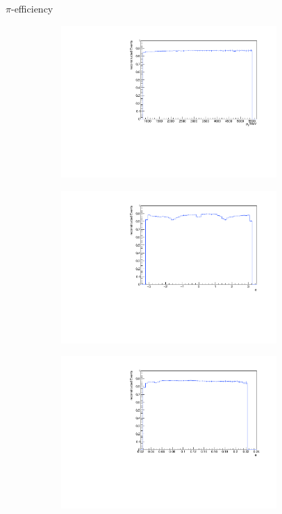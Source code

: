 \documentclass[11pt]{beamer}
\begin{document}
\begin{frame}{$\pi$-efficiency}
\begin{figure}
\begin{subfigure}{0.45\textwidth}
\includegraphics[width=0.9\textwidth]{up_pdf/single/neg/h_pt_reco_Pi_neg.pdf}
\end{subfigure}
\begin{subfigure}{0.45\textwidth}
\includegraphics[width=0.9\textwidth]{up_pdf/single/neg/h_phi_reco_Pi_neg.pdf}
\end{subfigure}
\begin{subfigure}{0.45\textwidth}
\includegraphics[width=0.9\textwidth]{up_pdf/single/neg/h_theta_reco_Pi_neg.pdf}

\end{subfigure}
\end{figure}
\end{frame}
\end{document}
